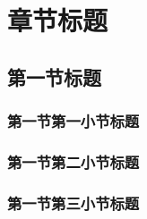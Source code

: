 \chapter{章节标题}\label{chapter3}
\vbox{}
\vbox{}
\section{第一节标题}\label{section31}
\vbox{}
\vbox{}
\subsection{第一节第一小节标题}\label{section311}
\vbox{}
\vbox{}
\subsection{第一节第二小节标题}\label{section312}
\vbox{}
\vbox{}
\subsection{第一节第三小节标题}\label{section313}
\vbox{}
\vbox{}






